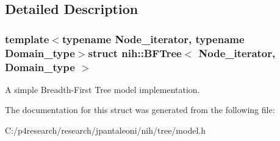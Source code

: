 \subsection{\-Detailed \-Description}
\subsubsection*{template$<$typename Node\-\_\-iterator, typename Domain\-\_\-type$>$struct nih\-::\-B\-F\-Tree$<$ Node\-\_\-iterator, Domain\-\_\-type $>$}

\-A simple \-Breadth-\/\-First \-Tree model implementation. 

\-The documentation for this struct was generated from the following file\-:\begin{DoxyCompactItemize}
\item 
\-C\-:/p4research/research/jpantaleoni/nih/tree/model.\-h\end{DoxyCompactItemize}
